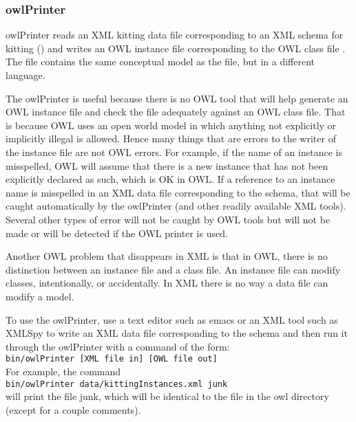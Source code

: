 \subsubsection{owlPrinter}
owlPrinter reads an XML kitting data file corresponding to an XML schema for kitting () and writes an OWL instance file corresponding to the OWL class file . The  file contains the same conceptual model as the  file, but in a different language.

The owlPrinter is useful because there is no OWL tool that will help generate an OWL instance file and check the file adequately against an OWL class file. That is because OWL uses an open world model in which anything not explicitly or implicitly illegal is allowed. Hence many things that are errors to the writer of the instance file are not OWL errors. For example, if the name of an instance is misspelled, OWL will assume that there is a new instance that has not been explicitly declared as such, which is OK in OWL. If a reference to an instance name is misspelled in an XML data file corresponding to the  schema, that will be caught automatically by the owlPrinter (and other readily available XML tools).  Several other types of error will not be caught by OWL tools but will not be made or will be detected if the OWL printer is used.

Another OWL problem that disappears in XML is that in OWL, there is no distinction between an instance file and a class file. An instance file can modify classes, intentionally, or accidentally. In XML there is no way a data file can modify a model.

To use the owlPrinter, use a text editor such as emacs or an XML tool such as XMLSpy to write an XML data file corresponding to the  schema and then run it through the owlPrinter with a command of the form:\\

\texttt{bin/owlPrinter [XML file in] [OWL file out]}\\

For example, the command\\

\texttt{bin/owlPrinter data/kittingInstances.xml junk}\\

will print the file junk, which will be identical to the  file in the owl directory (except for a couple comments).


